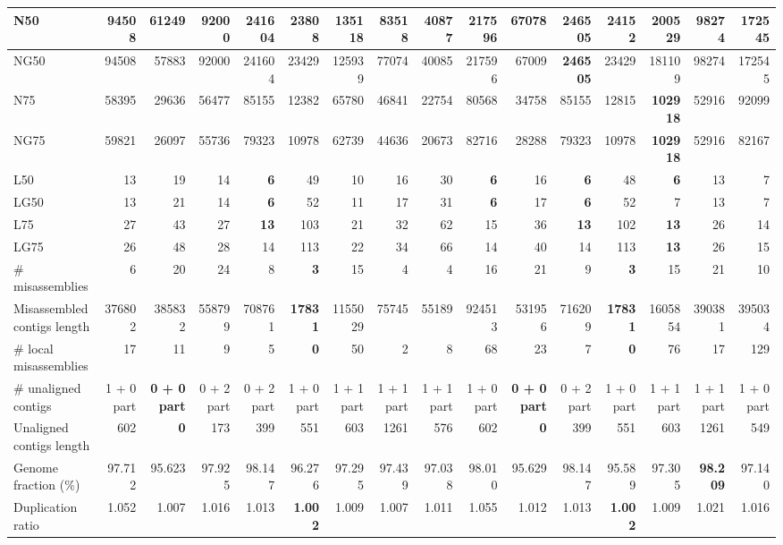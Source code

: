 \documentclass[12pt,a4paper]{article}
\begin{document}
\begin{table}[ht]
\begin{center}
\begin{tabular}{|l*{15}{|r}|}
N50 & 94508 & 61249 & 92000 & 241604 & 23808 & 135118 & 83518 & 40877 & 217596 & 67078 & {\bf 246505} & 24152 & 200529 & 98274 & 172545 \\ \hline
NG50 & 94508 & 57883 & 92000 & 241604 & 23429 & 125939 & 77074 & 40085 & 217596 & 67009 & {\bf 246505} & 23429 & 181109 & 98274 & 172545 \\ \hline
N75 & 58395 & 29636 & 56477 & 85155 & 12382 & 65780 & 46841 & 22754 & 80568 & 34758 & 85155 & 12815 & {\bf 102918} & 52916 & 92099 \\ \hline
NG75 & 59821 & 26097 & 55736 & 79323 & 10978 & 62739 & 44636 & 20673 & 82716 & 28288 & 79323 & 10978 & {\bf 102918} & 52916 & 82167 \\ \hline
L50 & 13 & 19 & 14 & {\bf 6} & 49 & 10 & 16 & 30 & {\bf 6} & 16 & {\bf 6} & 48 & {\bf 6} & 13 & 7 \\ \hline
LG50 & 13 & 21 & 14 & {\bf 6} & 52 & 11 & 17 & 31 & {\bf 6} & 17 & {\bf 6} & 52 & 7 & 13 & 7 \\ \hline
L75 & 27 & 43 & 27 & {\bf 13} & 103 & 21 & 32 & 62 & 15 & 36 & {\bf 13} & 102 & {\bf 13} & 26 & 14 \\ \hline
LG75 & 26 & 48 & 28 & 14 & 113 & 22 & 34 & 66 & 14 & 40 & 14 & 113 & {\bf 13} & 26 & 15 \\ \hline
\# misassemblies & 6 & 20 & 24 & 8 & {\bf 3} & 15 & 4 & 4 & 16 & 21 & 9 & {\bf 3} & 15 & 21 & 10 \\ \hline
Misassembled contigs length & 376802 & 385832 & 558799 & 708761 & {\bf 17831} & 1155029 & 75745 & 55189 & 924513 & 531956 & 716209 & {\bf 17831} & 1605854 & 390381 & 395034 \\ \hline
\# local misassemblies & 17 & 11 & 9 & 5 & {\bf 0} & 50 & 2 & 8 & 68 & 23 & 7 & {\bf 0} & 76 & 17 & 129 \\ \hline
\# unaligned contigs & 1 + 0 part & {\bf 0 + 0 part} & 0 + 2 part & 0 + 2 part & 1 + 0 part & 1 + 1 part & 1 + 1 part & 1 + 1 part & 1 + 0 part & {\bf 0 + 0 part} & 0 + 2 part & 1 + 0 part & 1 + 1 part & 1 + 1 part & 1 + 0 part \\ \hline
Unaligned contigs length & 602 & {\bf 0} & 173 & 399 & 551 & 603 & 1261 & 576 & 602 & {\bf 0} & 399 & 551 & 603 & 1261 & 549 \\ \hline
Genome fraction (\%) & 97.712 & 95.623 & 97.925 & 98.147 & 96.276 & 97.295 & 97.439 & 97.038 & 98.010 & 95.629 & 98.147 & 95.589 & 97.305 & {\bf 98.209} & 97.140 \\ \hline
Duplication ratio & 1.052 & 1.007 & 1.016 & 1.013 & {\bf 1.002} & 1.009 & 1.007 & 1.011 & 1.055 & 1.012 & 1.013 & {\bf 1.002} & 1.009 & 1.021 & 1.016 \\ \hline

\end{tabular}
\end{center}
\end{table}
\end{document}
